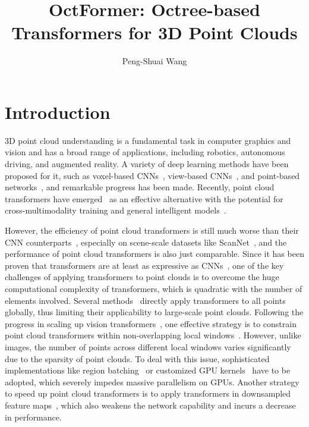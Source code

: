 \documentclass[acmtog,screen,authorversion]{acmart}
\title{OctFormer: Octree-based Transformers for 3D Point Clouds}
\author{Peng-Shuai Wang}
\affiliation{
 \institution{Peking University}
 \country{China}
}
\begin{document}
\maketitle


\section{Introduction} \label{sec:intro}

3D point cloud understanding is a fundamental task in computer graphics and vision and has a broad range of applications, including robotics, autonomous driving, and augmented reality.
A variety of deep learning methods have been proposed for it, such as voxel-based CNNs~\cite{Wu2015,Wang2017,Graham2018}, view-based CNNs~\cite{Su2015}, and point-based networks~\cite{Qi2016,Qi2017,Li2018}, and remarkable progress has been made.
Recently, point cloud transformers have emerged~\cite{Guo2021,Zhao2021,Misra2021} as an effective alternative with the potential for cross-multimodality training and general intelligent models~\cite{Radford2021,Ramesh2022}.

However, the efficiency of point cloud transformers is still much worse than their CNN counterparts~\cite{Wang2017,Choy2019,Nekrasov2021}, especially on scene-scale datasets like ScanNet~\cite{Dai2017a}, and the performance of point cloud transformers is also just comparable.
Since it has been proven that transformers are at least as expressive as CNNs~\cite{Cordonnier2020},
one of the key challenges of applying transformers to point clouds is to overcome the huge computational complexity of transformers, which is quadratic with the number of elements involved.
Several methods~\cite{Guo2021,Yu2022,Pang2022} directly apply transformers to all points globally, thus limiting their applicability to large-scale point clouds.
Following the progress in scaling up vision transformers~\cite{Liu2021a,Dong2022}, one effective strategy is to constrain point cloud transformers within non-overlapping local windows~\cite{Lai2022,Sun2022,Fan2022,Mao2021}.
However, unlike images, the number of points across different local windows varies significantly due to the sparsity of point clouds.
To deal with this issue, sophisticated implementations like region batching~\cite{Fan2022,Sun2022} or customized GPU kernels~\cite{Lai2022} have to be adopted, which severely impedes massive parallelism on GPUs.
Another strategy to speed up point cloud transformers is to apply transformers in downsampled feature maps~\cite{Park2022,Cheng2022}, which also weakens the network capability and incurs a decrease in performance.
\end{document}
